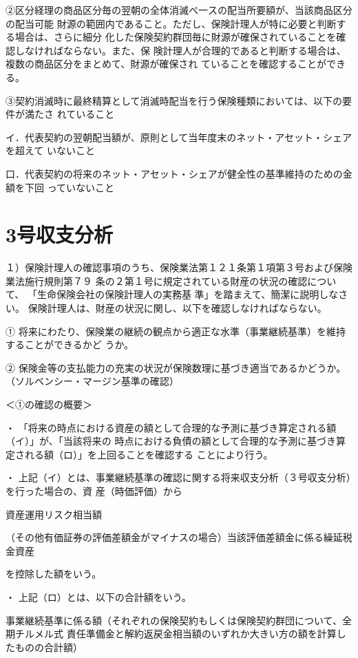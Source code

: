 \documentclass[report,gutter=10mm,fore-edge=10mm,uplatex,dvipdfmx]{jlreq}
\begin{document}
②区分経理の商品区分毎の翌朝の全体消滅べ一スの配当所要額が、当該商品区分の配当可能
財源の範囲内であること。ただし、保険計理人が特に必要と判断する場合は、さらに細分
化した保険契約群団毎に財源が確保されていることを確認しなければならない。また、保
険計理人が合理的であると判断する場合は、複数の商品区分をまとめて、財源が確保され
ていることを確認することができる。

③契約消滅時に最終精算として消滅時配当を行う保険種類においては、以下の要件が満たさ
れていること

イ．代表契約の翌朝配当額が、原則として当年度末のネット・アセット・シェアを超えて
いないこと

口．代表契約の将来のネット・アセット・シェアが健全性の基準維持のための金額を下回
っていないこと

\section{3号収支分析}

１）保険計理人の確認事項のうち、保険業法第１２１条第１項第３号および保険業法施行規則第７９
条の２第１号に規定されている財産の状況の確認について、
「生命保険会社の保険計理人の実務基
準」を踏まえて、簡潔に説明しなさい。
\answer{}
保険計理人は、財産の状況に関し、以下を確認しなければならない。

① 将来にわたり、保険業の継続の観点から適正な水準（事業継続基準）を維持することができるかど
うか。

② 保険金等の支払能力の充実の状況が保険数理に基づき適当であるかどうか。
（ソルベンシー・マージン基準の確認）

＜①の確認の概要＞

・ 「将来の時点における資産の額として合理的な予測に基づき算定される額（イ）」が、「当該将来の
時点における負債の額として合理的な予測に基づき算定される額（ロ）」を上回ることを確認する
ことにより行う。

・ 上記（イ）とは、事業継続基準の確認に関する将来収支分析（３号収支分析）を行った場合の、資
産（時価評価）から

資産運用リスク相当額

（その他有価証券の評価差額金がマイナスの場合）当該評価差額金に係る繰延税金資産

を控除した額をいう。

・ 上記（ロ）とは、以下の合計額をいう。

事業継続基準に係る額（それぞれの保険契約もしくは保険契約群団について、全期チルメル式
責任準備金と解約返戻金相当額のいずれか大きい方の額を計算したものの合計額）
\end{document}
